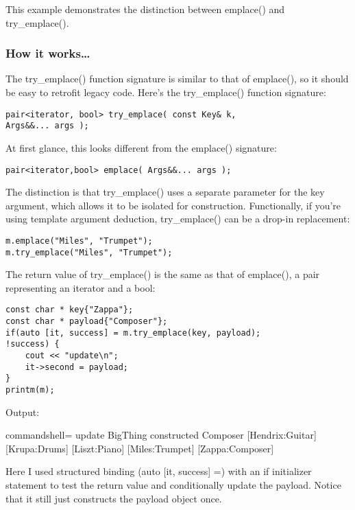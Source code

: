 This example demonstrates the distinction between emplace() and try\_emplace().

\subsubsection{How it works…}

The try\_emplace() function signature is similar to that of emplace(), so it should be easy to retrofit legacy code. Here's the try\_emplace() function signature:

\begin{lstlisting}[style=styleCXX]
pair<iterator, bool> try_emplace( const Key& k,
Args&&... args );
\end{lstlisting}

At first glance, this looks different from the emplace() signature:

\begin{lstlisting}[style=styleCXX]
pair<iterator,bool> emplace( Args&&... args );
\end{lstlisting}

The distinction is that try\_emplace() uses a separate parameter for the key argument, which allows it to be isolated for construction. Functionally, if you're using template argument deduction, try\_emplace() can be a drop-in replacement:

\begin{lstlisting}[style=styleCXX]
m.emplace("Miles", "Trumpet");
m.try_emplace("Miles", "Trumpet");
\end{lstlisting}

The return value of try\_emplace() is the same as that of emplace(), a pair representing an iterator and a bool:

\begin{lstlisting}[style=styleCXX]
const char * key{"Zappa"};
const char * payload{"Composer"};
if(auto [it, success] = m.try_emplace(key, payload);
!success) {
	cout << "update\n";
	it->second = payload;
}
printm(m);
\end{lstlisting}

Output:

\begin{tcblisting}{commandshell={}}
update
BigThing constructed Composer
[Hendrix:Guitar] [Krupa:Drums] [Liszt:Piano] [Miles:Trumpet]
[Zappa:Composer]
\end{tcblisting}

Here I used structured binding (auto [it, success] =) with an if initializer statement to test the return value and conditionally update the payload. Notice that it still just constructs the payload object once.

